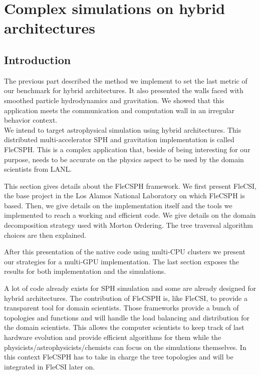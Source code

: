 \chapter{Complex simulations on hybrid architectures}

\section{Introduction}

The previous part described the method we implement to set the last metric of our benchmark for hybrid architectures.
It also presented the walls faced with smoothed particle hydrodynamics and gravitation. 
We showed that this application meets the communication and computation wall in an irregular behavior context.\\

We intend to target astrophysical simulation using hybrid architectures. 
This distributed multi-accelerator SPH and gravitation implementation is called FleCSPH. 
This is a complex application that, beside of being interesting for our purpose, needs to be accurate on the physics aspect to be used by the domain scientists from LANL. 

This section gives details about the FleCSPH framework. 
We first present FleCSI, the base project in the Los Alamos National Laboratory on which FleCSPH is based. 
Then, we give details on the implementation itself and the tools we implemented to reach a working and efficient code. 
We give details on the domain decomposition strategy used with Morton Ordering. 
The tree traversal algorithm choices are then explained. 

After this presentation of the native code using multi-CPU clusters we present our strategies for a multi-GPU implementation. 
The last section exposes the results for both implementation and the simulations. 

A lot of code already exists for SPH simulation and some are already designed for hybrid architectures.
The contribution of FleCSPH is, like FleCSI, to provide a transparent tool for domain scientists. 
Those frameworks provide a bunch of topologies and functions and will handle the load balancing and distribution for the domain scientists. 
This allows the computer scientists to keep track of last hardware evolution and provide efficient algorithms for them while the physicists/astrophysicists/chemists can focus on the simulations themselves. 
In this context FleCSPH has to take in charge the tree topologies and will be integrated in FleCSI later on. 

